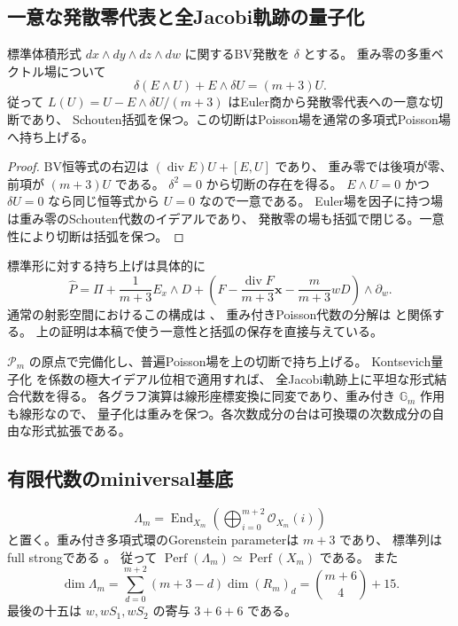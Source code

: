 \subsection{一意な発散零代表と全Jacobi軌跡の量子化}

\begin{lemma}[重み付きEuler切断]
\label{lem:general-lift-v33}
標準体積形式 $dx\wedge dy\wedge dz\wedge dw$ に関するBV発散を $\delta$ とする。
重み零の多重ベクトル場について
\[
 \delta(E\wedge U)+E\wedge\delta U=(m+3)U.
\]
従って $L(U)=U-E\wedge\delta U/(m+3)$ はEuler商から発散零代表への一意な切断であり、
Schouten括弧を保つ。この切断はPoisson場を通常の多項式Poisson場へ持ち上げる。
\end{lemma}

\begin{proof}
BV恒等式の右辺は $(\operatorname{div}E)U+[E,U]$ であり、
重み零では後項が零、前項が $(m+3)U$ である。
$\delta^2=0$ から切断の存在を得る。
$E\wedge U=0$ かつ $\delta U=0$ なら同じ恒等式から $U=0$ なので一意である。
Euler場を因子に持つ場は重み零のSchouten代数のイデアルであり、
発散零の場も括弧で閉じる。一意性により切断は括弧を保つ。
\end{proof}

標準形に対する持ち上げは具体的に
\[
 \widehat P=\Pi+\frac1{m+3}E_x\wedge D+
 \left(F-\frac{\operatorname{div}F}{m+3}\mathbf x
               -\frac m{m+3}wD\right)\wedge\partial_w.
\]
通常の射影空間におけるこの構成は \cite[\S2.2]{Pym}、
重み付きPoisson代数の分解は \cite{TWW} と関係する。
上の証明は本稿で使う一意性と括弧の保存を直接与えている。

$\mathscr P_m$ の原点で完備化し、普遍Poisson場を上の切断で持ち上げる。
Kontsevich量子化 \cite{Kontsevich} を係数の極大イデアル位相で適用すれば、
全Jacobi軌跡上に平坦な形式結合代数を得る。
各グラフ演算は線形座標変換に同変であり、重み付き $\mathbb G_m$ 作用も線形なので、
量子化は重みを保つ。各次数成分の台は可換環の次数成分の自由な形式拡張である。

\subsection{有限代数のminiversal基底}

\[
 \Lambda_m=\operatorname{End}_{X_m}
    \left(\bigoplus_{i=0}^{m+2}\mathcal O_{X_m}(i)\right)
\]
と置く。重み付き多項式環のGorenstein parameterは $m+3$ であり、
標準列はfull strongである \cite[Corollary~2.7]{Orlov2009}。
従って $\operatorname{Perf}(\Lambda_m)\simeq\operatorname{Perf}(X_m)$ である。
また
\[
 \dim\Lambda_m=\sum_{d=0}^{m+2}(m+3-d)\dim(R_m)_d
              =\binom{m+6}{4}+15.
\]
最後の十五は $w,wS_1,wS_2$ の寄与 $3+6+6$ である。

